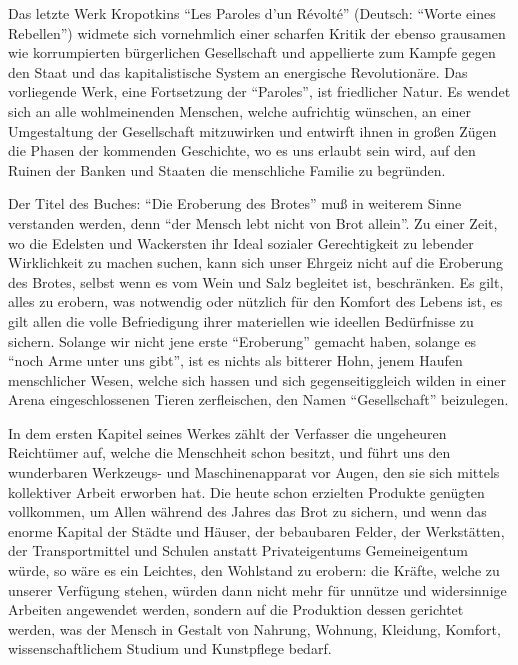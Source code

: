 \documentclass{scrbook}
\begin{document}
Das letzte Werk Kropotkins ``Les Paroles d’un Révolté'' (Deutsch: ``Worte eines Rebellen'') widmete sich vornehmlich einer scharfen Kritik der ebenso grausamen wie korrumpierten bürgerlichen Gesellschaft und appellierte zum Kampfe gegen den Staat und das kapitalistische System an energische Revolutionäre. Das vorliegende Werk, eine Fortsetzung der ``Paroles'', ist friedlicher Natur. Es wendet sich an alle wohlmeinenden Menschen, welche aufrichtig wünschen, an einer Umgestaltung der Gesellschaft mitzuwirken und entwirft ihnen in großen Zügen die Phasen der kommenden Geschichte, wo es uns erlaubt sein wird, auf den Ruinen der Banken und Staaten die menschliche Familie zu begründen.

Der Titel des Buches: ``Die Eroberung des Brotes'' muß in weiterem Sinne verstanden werden, denn ``der Mensch lebt nicht von Brot allein''. Zu einer Zeit, wo die Edelsten und Wackersten ihr Ideal sozialer Gerechtigkeit zu lebender Wirklichkeit zu machen suchen, kann sich unser Ehrgeiz nicht auf die Eroberung des Brotes, selbst wenn es vom Wein und Salz begleitet ist, beschränken. Es gilt, alles zu erobern, was notwendig oder nützlich für den Komfort des Lebens ist, es gilt allen die volle Befriedigung ihrer materiellen wie ideellen Bedürfnisse zu sichern. Solange wir nicht jene erste ``Eroberung'' gemacht haben, solange es ``noch Arme unter uns gibt'', ist es nichts als bitterer Hohn, jenem Haufen menschlicher Wesen, welche sich hassen und sich gegenseitiggleich wilden in einer Arena eingeschlossenen Tieren zerfleischen, den Namen ``Gesellschaft'' beizulegen.

In dem ersten Kapitel seines Werkes zählt der Verfasser die ungeheuren Reichtümer auf, welche die Menschheit schon besitzt, und führt uns den wunderbaren Werkzeugs-  und Maschinenapparat vor Augen, den sie sich mittels kollektiver Arbeit erworben hat. Die heute schon erzielten Produkte genügten vollkommen, um Allen während des Jahres das Brot zu sichern, und wenn das enorme Kapital der Städte und Häuser, der bebaubaren Felder, der Werkstätten, der Transportmittel und Schulen anstatt Privateigentums Gemeineigentum würde, so wäre es ein Leichtes, den Wohlstand zu erobern: die Kräfte, welche zu unserer Verfügung stehen, würden dann nicht mehr für unnütze und widersinnige Arbeiten angewendet werden, sondern auf die Produktion dessen gerichtet werden, was der Mensch in Gestalt von Nahrung, Wohnung, Kleidung, Komfort, wissenschaftlichem Studium und Kunstpflege bedarf.
\end{document}
